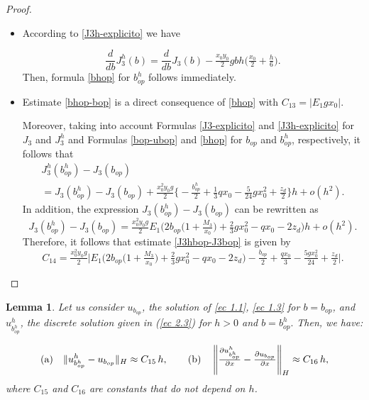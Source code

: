 \documentclass[11pt]{article}
\newcommand\pder[2][]{\ensuremath{\tfrac{\partial#1}{\partial#2}}}
\newtheorem{Lemma}{Lemma}
\begin{document}
\begin{proof} $ $


\begin{itemize}
\item[(a)] According to \eqref{J3h-explicito} we have

  \begin{equation}\label{J3h-derivada}
{ \frac{d}{db}J^h_{3}} (b)= \frac{d}{db} J_3(b) -\tfrac{x_0 y_0 }{2} g  b h  \Big( \tfrac{x_0}{2} + \tfrac{h}{6}  \Big) .
\end{equation}
Then, formula \eqref{bhop} for ${b^h_{op}}$ follows immediately.

\item[(b)] Estimate \eqref{bhop-bop}  is a direct consequence of \eqref{bhop} with $C_{13}=|E_1 g x_0|$. 

Moreover, taking into account Formulas \eqref{J3-explicito} and \eqref{J3h-explicito} for $J_3$ and ${J^h_{3}}$ and Formulas \eqref{bop-ubop} and \eqref{bhop} for $b_{op}$ and ${b^h_{op}}$, respectively, it follows that
$$\begin{array}{l}
{J^h_{3}} ({b^h_{op}})- J_3(b_{op})\\[0.45cm]
=J_{3} ({b^h_{op}})- J_3(b_{op}) +\tfrac{x_0^2 y_0 g}{2} \Big\{ - \tfrac{{b^h_{op}}}{2} + \tfrac{1}{3} q x_0-\tfrac{5}{24} g x_0^2+\tfrac{z_d}{2} \Big\} h+ o(h^2).
\end{array}
$$
In addition, the expression  $J_{3} ({b^h_{op}})- J_3(b_{op})$ can be rewritten as
$$
J_{3} ({b^h_{op}})- J_3(b_{op})=\tfrac{x_0^2 y_0 g }{2} E_1   \Big( 2b_{op} \Big(1+ \tfrac{M_3}{x_0} \Big)+\tfrac{2}{3} g x_0^2-q x_0-2 z_d\Big)h+o(h^2).
$$
Therefore, it follows that estimate \eqref{J3hbop-J3bop} is given by  
 \[ C_{14}=  \tfrac{x_0^2  y_0 g}{2} \Big\lvert E_1  \Big( 2b_{op} \Big(1+ \tfrac{M_3}{x_0} \Big)+\tfrac{2}{3} g x_0^2-q x_0-2 z_d\Big)-\tfrac{b_{op}}{2} + \tfrac{q x_0}{3} - \tfrac{5 g x_0^2}{24}+ \tfrac{z_d}{2}\Big \rvert  \textbf{.}\]
\end{itemize}
\end{proof}
            

\begin{Lemma} Let us consider $u_{b_{op}}$, the solution of \eqref{ec 1.1}, \eqref{ec 1.3} for $b= b_{op}$, and
		${ u^h_{b^h_{op}}}$, the discrete solution  given in (\ref{ec 2.3}) for  $h>0$ and $b={b^h_{op}}.$ Then, we have:
						
	 \begin{equation}  \label{difu-problema3} {\rm (a)} \quad  			      
  				  \lVert {u^h_{b^h_{op}}} - u_{b_{op}}  \rVert _H \approx C_{15}\, h,
  \quad \quad
     {\rm (b)}\quad
        \left\lVert \pder[{u^h_{b^h_{op}}}]{x} - \pder[u_{b_{op}}]{x} \right\rVert _H \approx C_{16} \,h,
\end{equation}
where $C_{15}$ and $C_{16}$ are constants that do not depend on $h$.
   \end{Lemma}   
    
\end{document}
